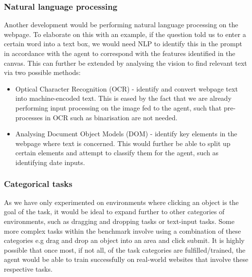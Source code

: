 \documentclass[conference]{IEEEtran}
\begin{document}
\subsubsection{Natural language processing}
Another development would be performing natural language processing on the webpage. To elaborate on this with an example, if the question told us to enter a certain word into a text box, we would need NLP to identify this in the prompt in accordance with the agent to correspond with the features identified in the canvas. This can further be extended by analysing the vision to find relevant text via two possible methods:
\indent
\begin{itemize}
\item Optical Character Recognition (OCR) - identify and convert webpage text into machine-encoded text. This is eased by the fact that we are already performing input processing on the image fed to the agent, such that pre-processes in OCR such as binarisation are not needed. 
\item Analysing Document Object Models (DOM) - identify key elements in the webpage where text is concerned. This would further be able to split up certain elements and attempt to classify them for the agent, such as identifying date inputs.
\end{itemize}

\subsubsection{Categorical tasks}
As we have only experimented on environments where clicking an object is the goal of the task, it would be ideal to expand further to other categories of environments, such as dragging and dropping tasks or text-input tasks. Some more complex tasks within the benchmark involve using a combination of these categories e.g drag and drop an object into an area and click submit. It is highly possible that once most, if not all, of the task categories are fulfilled/trained, the agent would be able to train successfully on real-world websites that involve these respective tasks.











\end{document}
